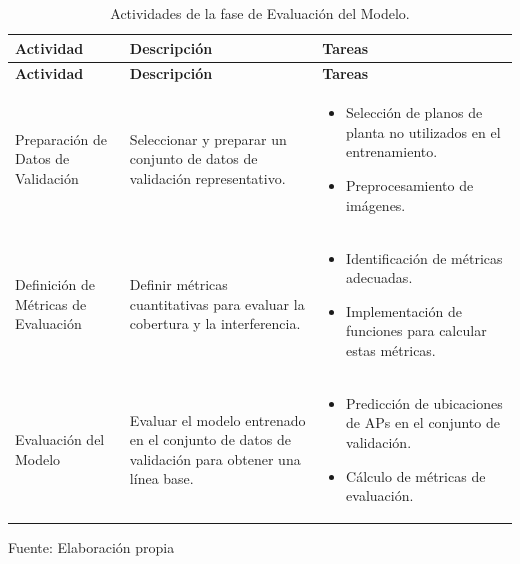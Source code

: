 \begin{longtable}{|>{\raggedright\arraybackslash}p{4cm}|>{\raggedright\arraybackslash}p{5cm}|>{\raggedright\arraybackslash}p{6cm}|}
    \caption{Actividades de la fase de Evaluación del Modelo.}
    \label{tabla:actividades}\\
    \hline
    \textbf{Actividad} & \textbf{Descripción} & \textbf{Tareas} \\
    \hline
    \endfirsthead

    \hline
    \textbf{Actividad} & \textbf{Descripción} & \textbf{Tareas} \\
    \hline
    \endhead

    \hline
    \endfoot

    \hline
    \endlastfoot

    Preparación de Datos de Validación & Seleccionar y preparar un conjunto de datos de validación representativo. & 
    \begin{itemize}
        \item Selección de planos de planta no utilizados en el entrenamiento.
        \item Preprocesamiento de imágenes.
    \end{itemize} \\
    \hline
    Definición de Métricas de Evaluación & Definir métricas cuantitativas para evaluar la cobertura y la interferencia. & 
    \begin{itemize}
        \item Identificación de métricas adecuadas.
        \item Implementación de funciones para calcular estas métricas.
    \end{itemize} \\
    \hline
    Evaluación del Modelo & Evaluar el modelo entrenado en el conjunto de datos de validación para obtener una línea base. & 
    \begin{itemize}
        \item Predicción de ubicaciones de APs en el conjunto de validación.
        \item Cálculo de métricas de evaluación.
    \end{itemize} \\
    \hline
\end{longtable}
\begin{flushleft}	%
	\small Fuente: Elaboración propia
\end{flushleft}

